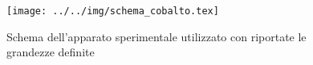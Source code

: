 \begin{figure}[h]\centering\texttt{[image: ../../img/schema\_cobalto.tex]}\caption{Schema dell'apparato sperimentale utilizzato con riportate le grandezze definite }\label{fig:schema_cobalto}\end{figure}
